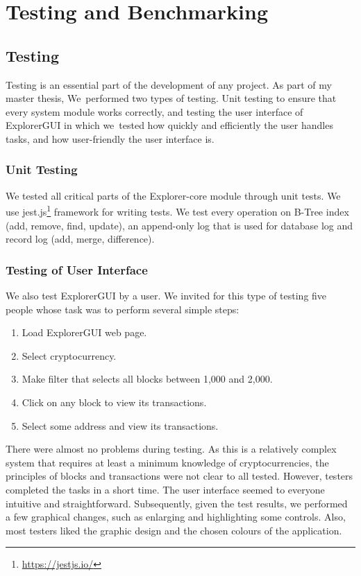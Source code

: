 \chapter{Testing and Benchmarking}

\section{Testing}
Testing is an essential part of the development of any project. As part of my master thesis, We~performed two types of testing. Unit testing to ensure that every system module works correctly, and testing the user interface of ExplorerGUI in which we~tested how quickly and efficiently the user handles tasks, and how user-friendly the user interface is.

\subsection{Unit Testing}
We tested all critical parts of the Explorer-core module through unit tests. We use jest.js\footnote{\url{https://jestjs.io/}} framework for writing tests. We test every operation on B-Tree index (add, remove, find, update), an append-only log that is used for database log and record log (add, merge, difference).


\subsection{Testing of User Interface}
We also test ExplorerGUI by a user. We invited for this type of testing five people whose task was to perform several simple steps:
\begin{enumerate}
    \item Load ExplorerGUI web page.
    \item Select cryptocurrency.
    \item Make filter that selects all blocks between 1,000 and 2,000.
    \item Click on any block to view its transactions.
    \item Select some address and view its transactions.
\end{enumerate}
There were almost no problems during testing. As this is a relatively complex system that requires at least a minimum knowledge of cryptocurrencies, the principles of blocks and transactions were not clear to all tested. However, testers completed the tasks in a short time. The user interface seemed to everyone intuitive and straightforward. Subsequently, given the test results, we performed a few graphical changes, such as enlarging and highlighting some controls. Also, most testers liked the graphic design and the chosen colours of the application.




